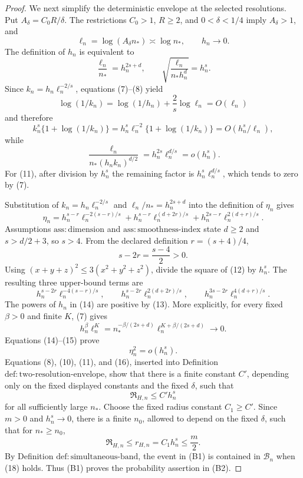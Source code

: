 \documentclass{article}
\begin{document}
\begin{proof}
We next simplify the deterministic envelope at the selected resolutions.  Put \(A_\delta=C_0R/\delta\).  The restrictions \(C_0>1\), \(R\ge2\), and \(0<\delta<1/4\) imply \(A_\delta>1\), and
\[
 \ell_n=\log(A_\delta n_\ast)\asymp\log n_\ast,
 \qquad
 h_n\longrightarrow0.
 \tag{7}
\]
The definition of \(h_n\) is equivalent to
\[
 \frac{\ell_n}{n_\ast}=h_n^{2s+d},
 \qquad
 \sqrt{\frac{\ell_n}{n_\ast h_n^d}}=h_n^s.
 \tag{8}
\]
Since \(k_n=h_n\ell_n^{-2/s}\), equations (7)--(8) yield
\[
 \log(1/k_n)=\log(1/h_n)+\frac2s\log\ell_n=O(\ell_n)
 \tag{9}
\]
and therefore
\[
 k_n^s\{1+\log(1/k_n)\}
 =h_n^s\ell_n^{-2}\{1+\log(1/k_n)\}
 =O(h_n^s/\ell_n),
 \tag{10}
\]
while
\[
 \frac{\ell_n}{n_\ast(h_nk_n)^{d/2}}
 =h_n^{2s}\ell_n^{d/s}=o(h_n^s).
 \tag{11}
\]
For (11), after division by \(h_n^s\) the remaining factor is \(h_n^s\ell_n^{d/s}\), which tends to zero by (7).

Substitution of \(k_n=h_n\ell_n^{-2/s}\) and \(\ell_n/n_\ast=h_n^{2s+d}\) into the definition of \(\eta_n\) gives
\[
 \eta_n
 =h_n^{s-r}\ell_n^{-2(s-r)/s}
 +h_n^{s-r}\ell_n^{(d+2r)/s}
 +h_n^{2s-r}\ell_n^{2(d+r)/s}.
 \tag{12}
\]
Assumptions \(\mathrm{ass:dimension}\) and \(\mathrm{ass:smoothness\text{-}index}\) state \(d\ge2\) and \(s>d/2+3\), so \(s>4\).  From the declared definition \(r=(s+4)/4\),
\[
 s-2r=\frac{s-4}{2}>0.
 \tag{13}
\]
Using \((x+y+z)^2\le3(x^2+y^2+z^2)\), divide the square of (12) by \(h_n^s\).  The resulting three upper-bound terms are
\[
 h_n^{s-2r}\ell_n^{-4(s-r)/s},
 \qquad
 h_n^{s-2r}\ell_n^{2(d+2r)/s},
 \qquad
 h_n^{3s-2r}\ell_n^{4(d+r)/s}.
 \tag{14}
\]
The powers of \(h_n\) in (14) are positive by (13).  More explicitly, for every fixed \(\beta>0\) and finite \(K\), (7) gives
\[
 h_n^\beta\ell_n^K
 =n_\ast^{-\beta/(2s+d)}
   \ell_n^{K+\beta/(2s+d)}\longrightarrow0.
 \tag{15}
\]
Equations (14)--(15) prove
\[
 \eta_n^2=o(h_n^s).
 \tag{16}
\]
Equations (8), (10), (11), and (16), inserted into Definition \(\mathrm{def:two\text{-}resolution\text{-}envelope}\), show that there is a finite constant \(C'\), depending only on the fixed displayed constants and the fixed \(\delta\), such that
\[
 \mathfrak R_{H,n}\le C'h_n^s
 \tag{17}
\]
for all sufficiently large \(n_\ast\).  Choose the fixed radius constant \(C_1\ge C'\).  Since \(m>0\) and \(h_n^s\to0\), there is a finite \(n_0\), allowed to depend on the fixed \(\delta\), such that for \(n_\ast\ge n_0\),
\[
 \mathfrak R_{H,n}\le r_{H,n}=C_1h_n^s\le\frac m2.
 \tag{18}
\]
By Definition \(\mathrm{def:simultaneous\text{-}band}\), the event in (B1) is contained in \(\mathcal B_n\) when (18) holds.  Thus (B1) proves the probability assertion in (B2).


\end{proof}
\end{document}
